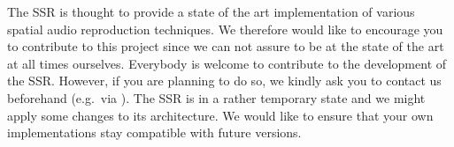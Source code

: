 The SSR is thought to provide a state of the art implementation of
various spatial audio reproduction techniques. We therefore would
like to encourage you to contribute to this project since we can
not assure to be at the state of the art at all times ourselves.
Everybody is welcome to contribute to the development of the SSR.
However, if you are planning to do so, we kindly ask you to contact
us beforehand (e.g.~via \contactadress). The SSR is in a rather
temporary state and we might apply some changes to its architecture.
We would like to ensure that your own implementations stay compatible
with future versions.

